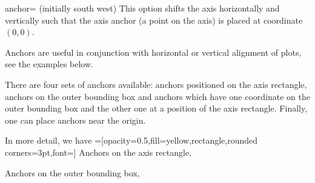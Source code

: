 \begin{pgfplotskey}{anchor= (initially south west)}
\label{option:anchor}%
This option shifts the axis horizontally and vertically such that the axis anchor (a point on the axis) is placed at coordinate $(0,0)$.

Anchors are useful in conjunction with horizontal or vertical alignment of plots, see the examples below.

There are four sets of anchors available: anchors positioned on the axis rectangle, anchors on the outer bounding box and anchors which have one coordinate on the outer bounding box and the other one at a position of the axis rectangle. Finally, one can place anchors near the origin.

{%
\plottable
\def\plot{%
	\begin{axis}[
		width=5cm,
		name=test plot,
		xlabel=$x$,
		ylabel={$y$},%
		y label style={yshift=-15pt},
		legend style={at={(1.03,1)},anchor=north west},
		title=A test plot.
	]
		\addplot table from{\plottable};
		\addlegendentry{$f(x)$}
		\addplot[red] plot[id=gnuplot_ppp,domain=-40:40,samples=120] function{10000*sin(x/3)};
		\addlegendentry{$g(x)$}
	\end{axis}
}%
\def\showit#1#2{%
	\node[pin=#2:(s.#1),fill=black,circle,scale=0.3] at (test plot.#1) {};
}%
In more detail, we have
=[opacity=0.5,fill=yellow,rectangle,rounded corners=3pt,font=\tiny]
Anchors on the axis rectangle,
		\begin{center}
		\end{center}
Anchors on the outer bounding box,
		\begin{center}
\end{center}}
\end{pgfplotskey}
